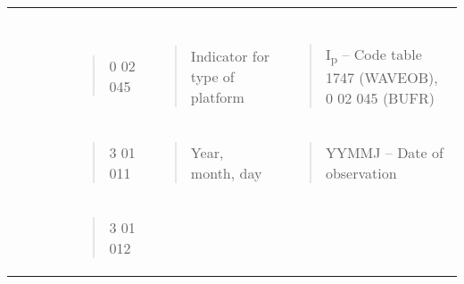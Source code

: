 \begin{longtable}[]{@{}llll@{}}
\begin{minipage}[t]{0.22\columnwidth}
\begin{quote}
\end{quote}\strut
\end{minipage}\tabularnewline
\begin{minipage}[t]{0.22\columnwidth}\raggedright
\strut
\end{minipage} & \begin{minipage}[t]{0.22\columnwidth}\raggedright
\begin{quote}
0 02 045
\end{quote}\strut
\end{minipage} & \begin{minipage}[t]{0.22\columnwidth}\raggedright
\begin{quote}
Indicator for type of platform
\end{quote}\strut
\end{minipage} & \begin{minipage}[t]{0.22\columnwidth}\raggedright
\begin{quote}
I\textsubscript{p} -- Code table 1747 (WAVEOB), 0 02 045 (BUFR)
\end{quote}\strut
\end{minipage}\tabularnewline
\begin{minipage}[t]{0.22\columnwidth}\raggedright
\strut
\end{minipage} & \begin{minipage}[t]{0.22\columnwidth}\raggedright
\begin{quote}
3 01 011
\end{quote}\strut
\end{minipage} & \begin{minipage}[t]{0.22\columnwidth}\raggedright
\begin{quote}
Year, month, day
\end{quote}\strut
\end{minipage} & \begin{minipage}[t]{0.22\columnwidth}\raggedright
\begin{quote}
YYMMJ -- Date of observation
\end{quote}\strut
\end{minipage}\tabularnewline
\begin{minipage}[t]{0.22\columnwidth}\raggedright
\strut
\end{minipage} & \begin{minipage}[t]{0.22\columnwidth}\raggedright
\begin{quote}
3 01 012
\end{quote}\strut
\end{minipage} & \begin{minipage}[t]{0.22\columnwidth}\raggedright

\end{minipage}
\end{longtable}
